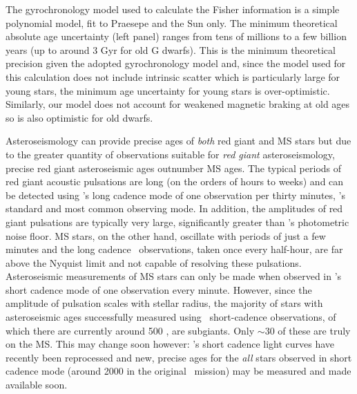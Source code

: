 The gyrochronology model used to calculate the Fisher information is a simple
polynomial model, fit to Praesepe and the Sun only.
The minimum theoretical absolute age uncertainty (left panel) ranges from tens
of millions to a few billion years (up to around 3 Gyr for old G dwarfs).
This is the minimum theoretical precision given the adopted gyrochronology
model and, since the model used for this calculation does not include
intrinsic scatter which is particularly large for young stars, the minimum age
uncertainty for young stars is over-optimistic.
Similarly, our model does not account for weakened magnetic braking at old
ages \citep{vansaders2016} so is also optimistic for old dwarfs.

Asteroseismology can provide precise ages of {\it both} red giant and MS stars
but due to the greater quantity of observations suitable for {\it red giant}
asteroseismology, precise red giant asteroseismic ages outnumber MS ages.
The typical periods of red giant acoustic pulsations are long (on the orders
of hours to weeks) and can be detected using \kepler's long cadence mode of
one observation per thirty minutes, \kepler's standard and most common
observing mode.
In addition, the amplitudes of red giant pulsations are typically very large,
significantly greater than \kepler's photometric noise floor.
MS stars, on the other hand, oscillate with periods of just a few minutes and
the long cadence \kepler\ observations, taken once every half-hour, are
far above the Nyquist limit and not capable of resolving these pulsations.
Asteroseismic measurements of MS stars can only be made when observed in
\kepler's short cadence mode of one observation every minute.
However, since the amplitude of pulsation scales with stellar radius, the
majority of stars with asteroseismic ages successfully measured using \kepler\
short-cadence observations, of which there are currently around 500
\citep{chaplin2014}, are subgiants.
Only $\sim$30 of these are truly on the MS.
This may change soon however: \kepler's short cadence
light curves have recently been reprocessed and new, precise ages for the {\it
all} stars observed in short cadence mode (around 2000 in the original
\kepler\ mission) may be measured and made available soon.

